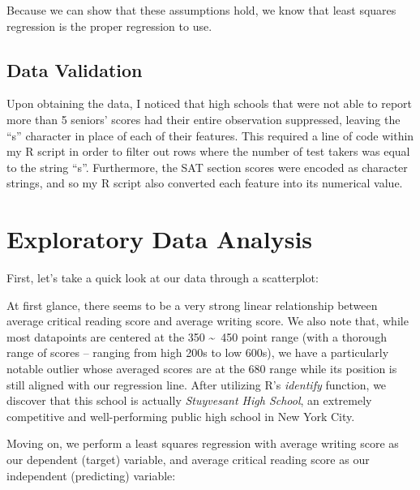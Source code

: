 \documentclass[11pt]{article} %
\begin{document}
Because we can show that these assumptions hold, we know that least squares regression is the proper regression to use.

\subsection*{Data Validation}
Upon obtaining the data, I noticed that high schools that were not able to report more than 5 seniors' scores had their entire observation suppressed, leaving the ``s'' character in place of each of their features. This required a line of code within my \textsc{R} script in order to filter out rows where the number of test takers was equal to the string ``s''. Furthermore, the SAT section scores were encoded as character strings, and so my \textsc{R} script also converted each feature into its numerical value.

\section*{Exploratory Data Analysis}
First, let's take a quick look at our data through a scatterplot:


At first glance, there seems to be a very strong linear relationship between average critical reading score and average writing score. We also note that, while most datapoints are centered at the 350 \textasciitilde\ 450 point range (with a thorough range of scores -- ranging from high 200s to low 600s), we have a particularly notable outlier whose averaged scores are at the 680 range while its position is still aligned with our regression line. After utilizing \textsc{R}'s \textit{identify} function, we discover that this school is actually \textit{Stuyvesant High School}, an extremely competitive and well-performing public high school in New York City. \par
Moving on, we perform a least squares regression with average writing score as our dependent (target) variable, and average critical reading score as our independent (predicting) variable:
\end{document}
